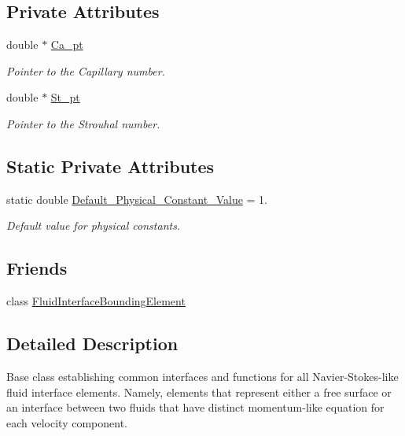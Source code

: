 \subsection*{Private Attributes}
\begin{DoxyCompactItemize}
\item 
double $\ast$ \hyperlink{classoomph_1_1FluidInterfaceElement_adaf6e3c6739fb9081f8865773a4d0c2c}{Ca\+\_\+pt}
\begin{DoxyCompactList}\small\item\em Pointer to the Capillary number. \end{DoxyCompactList}\item 
double $\ast$ \hyperlink{classoomph_1_1FluidInterfaceElement_ae32ade5ea1742938f538e5d5f812bb2a}{St\+\_\+pt}
\begin{DoxyCompactList}\small\item\em Pointer to the Strouhal number. \end{DoxyCompactList}\end{DoxyCompactItemize}
\subsection*{Static Private Attributes}
\begin{DoxyCompactItemize}
\item 
static double \hyperlink{classoomph_1_1FluidInterfaceElement_adbe9dc951b87449522f6d19e4acac538}{Default\+\_\+\+Physical\+\_\+\+Constant\+\_\+\+Value} = 1.
\begin{DoxyCompactList}\small\item\em Default value for physical constants. \end{DoxyCompactList}\end{DoxyCompactItemize}
\subsection*{Friends}
\begin{DoxyCompactItemize}
\item 
class \hyperlink{classoomph_1_1FluidInterfaceElement_af0eab9c2aa8fc5a5006df03ab93c015f}{Fluid\+Interface\+Bounding\+Element}
\end{DoxyCompactItemize}


\subsection{Detailed Description}
Base class establishing common interfaces and functions for all Navier-\/\+Stokes-\/like fluid interface elements. Namely, elements that represent either a free surface or an interface between two fluids that have distinct momentum-\/like equation for each velocity component. 

